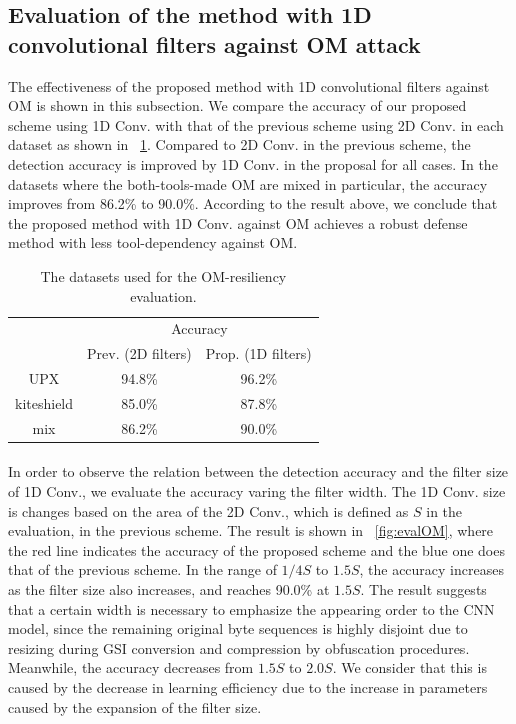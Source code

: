 \documentclass{ieeeaccess}
\begin{document}
\subsection{Evaluation of the method with 1D convolutional filters against OM attack}
The effectiveness of the proposed method with 1D convolutional filters against OM is shown in this subsection.
We compare the accuracy of our proposed scheme using 1D Conv. with that of the previous scheme using 2D Conv. in each dataset as shown in \tablename~\ref{tab:evalOM}.
Compared to 2D Conv. in the previous scheme, the detection accuracy is improved by 1D Conv. in the proposal for all cases.
In the datasets where the both-tools-made OM are mixed in particular, the accuracy improves from 86.2\% to 90.0\%.
According to the result above, we conclude that the proposed method with 1D Conv. against OM achieves a robust defense method with less tool-dependency against OM.
\begin{table}[h]
  \begin{center}
    \caption{The datasets used for the OM-resiliency evaluation.}
    \label{tab:evalOM} 
    \begin{tabular}{|c|c|c|} \hline
      \multirow{2}{*}{\hfill  \hfill} & \multicolumn{2}{c|}{Accuracy}  \\ \cline{2-3} 
					     & Prev. (2D filters) & Prop. (1D filters) \\ \hline \hline
      UPX & 94.8\% & 96.2\% \\ \cline{1-3} 
      kiteshield & 85.0\% & 87.8\% \\ \cline{1-3} 
      mix & 86.2\% & 90.0\% \\ \cline{1-3} 
  \end{tabular}
  \end{center}
\end{table}

\paragraph*{}
In order to observe the relation between the detection accuracy and the filter size of 1D Conv., we evaluate the accuracy varing the filter width.
The 1D Conv. size is changes based on the area of the 2D Conv., which is defined as $S$ in the evaluation, in the previous scheme.
The result is shown in \figurename~\ref{fig:evalOM}, where the red line indicates the accuracy of the proposed scheme and the blue one does that of the previous scheme.
In the range of $1/4S$ to $1.5S$, the accuracy increases as the filter size also increases, and reaches 90.0\% at $1.5S$.
The result suggests that a certain width is necessary to emphasize the appearing order to the CNN model, since the remaining original byte sequences is highly disjoint due to resizing during GSI conversion and compression by obfuscation procedures.
Meanwhile, the accuracy decreases from $1.5S$ to $2.0S$.
We consider that this is caused by the decrease in learning efficiency due to the increase in parameters caused by the expansion of the filter size.
\end{document}
